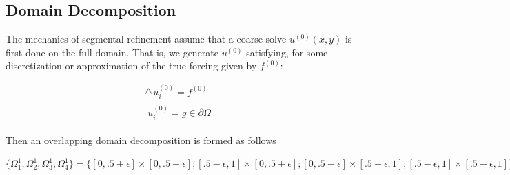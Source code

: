 \documentclass[final]{siamart1116}
\numberwithin{theorem}{section}
\begin{document}



\subsection{Domain Decomposition}

The mechanics of segmental refinement assume that a coarse solve $u^{(0)}(x, y) $ is first done on the full domain. That is, we generate $u^{(0)}$ satisfying, for some discretization or approximation of the true forcing given by $f^{(0)}$:


\begin{gather}
  \bigtriangleup u^{(0)}_i = f^{(0)} \nonumber \\
  \begin{split}
    u^{(0)}_i = g \in \partial \Omega \label{fullpde}
  \end{split}
\end{gather}


Then an overlapping domain decomposition is formed as follows


$\{ \Omega^{1}_1, \Omega^{1}_2, \Omega^{1}_3, \Omega^{1}_4 \} = \{[0,  .5 + \epsilon] \times [0, .5 + \epsilon] ; [.5-\epsilon, 1] \times  [0, .5+\epsilon] ; [0, .5+\epsilon] \times  [.5-\epsilon, 1] ; [.5-\epsilon, 1] \times  [.5-\epsilon, 1] \}$
\end{document}
